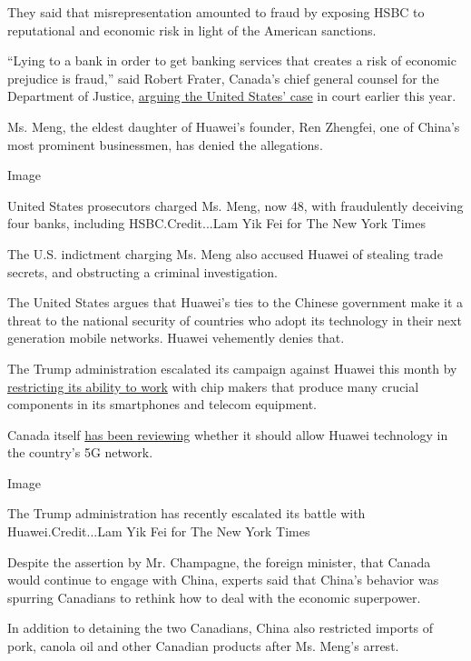 They said that misrepresentation amounted to fraud by exposing HSBC to
reputational and economic risk in light of the American sanctions.

``Lying to a bank in order to get banking services that creates a risk
of economic prejudice is fraud,'' said Robert Frater, Canada's chief
general counsel for the Department of Justice,
\href{https://www.nytimes3xbfgragh.onion/2020/01/20/world/canada/meng-wanzhou-huawei-detention-vancouver.html}{arguing
the United States' case} in court earlier this year.

Ms. Meng, the eldest daughter of Huawei's founder, Ren Zhengfei, one of
China's most prominent businessmen, has denied the allegations.

Image

United States prosecutors charged Ms. Meng, now 48, with fraudulently
deceiving four banks, including HSBC.Credit...Lam Yik Fei for The New
York Times

The U.S. indictment charging Ms. Meng also accused Huawei of stealing
trade secrets, and obstructing a criminal investigation.

The United States argues that Huawei's ties to the Chinese government
make it a threat to the national security of countries who adopt its
technology in their next generation mobile networks. Huawei vehemently
denies that.

The Trump administration escalated its campaign against Huawei this
month by
\href{https://www.nytimes3xbfgragh.onion/2020/05/15/business/economy/commerce-department-huawei.html}{restricting
its ability to work} with chip makers that produce many crucial
components in its smartphones and telecom equipment.

Canada itself
\href{https://www.nytimes3xbfgragh.onion/2019/02/27/world/canada/huawei-5g-meng-wanzhou-china.html?searchResultPosition=2}{has
been reviewing} whether it should allow Huawei technology in the
country's 5G network.

Image

The Trump administration has recently escalated its battle with
Huawei.Credit...Lam Yik Fei for The New York Times

Despite the assertion by Mr. Champagne, the foreign minister, that
Canada would continue to engage with China, experts said that China's
behavior was spurring Canadians to rethink how to deal with the economic
superpower.

In addition to detaining the two Canadians, China also restricted
imports of pork, canola oil and other Canadian products after Ms. Meng's
arrest.


